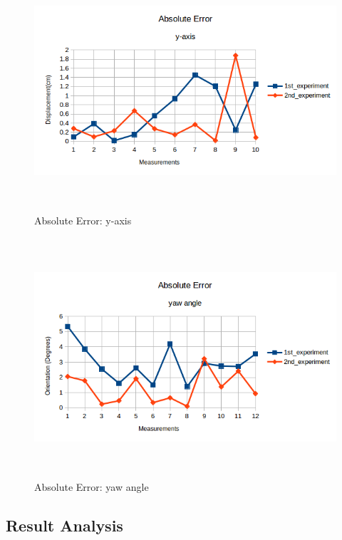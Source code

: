 \begin{figure}[!h]
\begin{center}
\includegraphics[width=5in, height=3.5in]{figures05/abs_error_y.png}
\caption{Absolute Error: y-axis}
\label{fig:absy}
\end{center}
\end{figure}

\begin{figure}[!h]
\begin{center}
\includegraphics[width=5in, height=3.5in]{figures05/abs_error_yaw.png}
\caption{Absolute Error: yaw angle}
\label{fig:absw}
\end{center}
\end{figure}

\subsection{Result Analysis}

